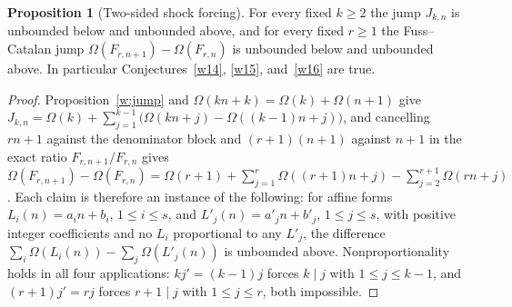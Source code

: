 \documentclass[11pt]{article}
\theoremstyle{definition}
\newtheorem{proposition}{Proposition}
\begin{document}
\begin{proposition}[Two-sided shock forcing]\label{w:shock}
For every fixed $k\ge2$ the jump $J_{k,n}$ is unbounded below and unbounded above, and for every fixed $r\ge1$ the Fuss--Catalan jump $\Omega(F_{r,n+1})-\Omega(F_{r,n})$ is unbounded below and unbounded above.  In particular Conjectures~\ref{w14}, \ref{w15}, and~\ref{w16} are true.
\end{proposition}

\begin{proof}
Proposition~\ref{w:jump} and $\Omega(kn+k)=\Omega(k)+\Omega(n+1)$ give $J_{k,n}=\Omega(k)+\sum_{j=1}^{k-1}\bigl(\Omega(kn+j)-\Omega((k-1)n+j)\bigr)$, and cancelling $rn+1$ against the denominator block and $(r+1)(n+1)$ against $n+1$ in the exact ratio $F_{r,n+1}/F_{r,n}$ gives $\Omega(F_{r,n+1})-\Omega(F_{r,n})=\Omega(r+1)+\sum_{j=1}^{r}\Omega((r+1)n+j)-\sum_{j=2}^{r+1}\Omega(rn+j)$.  Each claim is therefore an instance of the following: for affine forms $L_i(n)=a_in+b_i$, $1\le i\le s$, and $L'_j(n)=a'_jn+b'_j$, $1\le j\le s$, with positive integer coefficients and no $L_i$ proportional to any $L'_j$, the difference $\sum_i\Omega(L_i(n))-\sum_j\Omega(L'_j(n))$ is unbounded above.  Nonproportionality holds in all four applications: $kj'=(k-1)j$ forces $k\mid j$ with $1\le j\le k-1$, and $(r+1)j'=rj$ forces $r+1\mid j$ with $1\le j\le r$, both impossible.


\end{proof}
\end{document}
